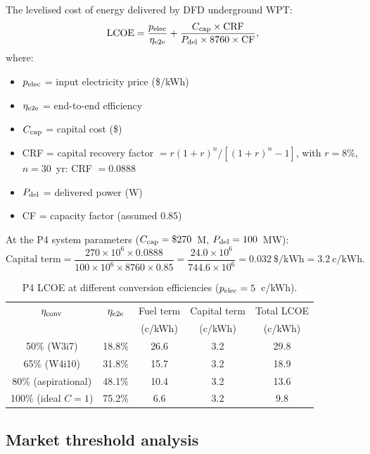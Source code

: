 \documentclass[11pt]{article}
\newcommand{\ee}[1]{\times 10^{#1}}
\begin{document}
The levelised cost of energy delivered by DFD underground WPT:
\begin{equation}
\text{LCOE} = \frac{p_{\rm elec}}{\eta_{\rm e2e}}
+ \frac{C_{\rm cap}\times\text{CRF}}{P_{\rm del}\times 8760\times\text{CF}},
\label{eq:LCOE-full}
\end{equation}
where:
\begin{itemize}[nosep]
\item $p_{\rm elec}$ = input electricity price (\$/kWh)
\item $\eta_{\rm e2e}$ = end-to-end efficiency
\item $C_{\rm cap}$ = capital cost (\$)
\item CRF = capital recovery factor
  $= r(1+r)^n/[(1+r)^n - 1]$, with $r = 8\%$, $n = 30$~yr: CRF $= 0.0888$
\item $P_{\rm del}$ = delivered power (W)
\item CF = capacity factor (assumed 0.85)
\end{itemize}

At the P4 system parameters ($C_{\rm cap} = \$270$~M, $P_{\rm del} =
100$~MW):
\begin{equation}
\text{Capital term} = \frac{270\ee{6}\times 0.0888}{100\ee{6}\times 8760
\times 0.85} = \frac{24.0\ee{6}}{744.6\ee{6}} = 0.032~\text{\$/kWh}
= 3.2~\text{c/kWh}.
\end{equation}

\begin{table}[H]
\centering
\caption{P4 LCOE at different conversion efficiencies ($p_{\rm elec} = 5$~c/kWh).}
\label{tab:LCOE-scenarios}
\begin{tabular}{@{}ccccc@{}}
\toprule
$\eta_{\rm conv}$ & $\eta_{\rm e2e}$ & Fuel term & Capital term & Total LCOE \\
 & & (c/kWh) & (c/kWh) & (c/kWh) \\
\midrule
50\% (W3i7) & 18.8\% & 26.6 & 3.2 & 29.8 \\
65\% (W4i10) & 31.8\% & 15.7 & 3.2 & 18.9 \\
80\% (aspirational) & 48.1\% & 10.4 & 3.2 & 13.6 \\
100\% (ideal $C=1$) & 75.2\% & 6.6 & 3.2 & 9.8 \\
\bottomrule
\end{tabular}
\end{table}

\subsection{Market threshold analysis}
\end{document}

